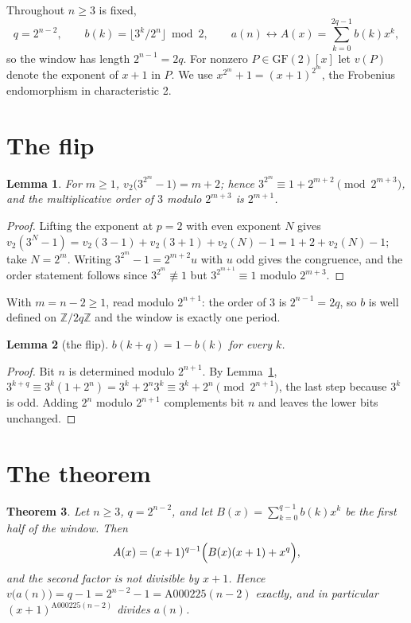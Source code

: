 \documentclass[11pt,a4paper]{article}
\theoremstyle{plain}
\newtheorem{theorem}{Theorem}
\newtheorem{lemma}[theorem]{Lemma}
\theoremstyle{definition}
\begin{document}
Throughout $n\ge3$ is fixed,
\[
  q=2^{n-2},\qquad b(k)=\bigl\lfloor 3^{k}/2^{n}\bigr\rfloor\bmod 2,\qquad
  a(n)\longleftrightarrow A(x)=\sum_{k=0}^{2q-1}b(k)x^{k},
\]
so the window has length $2^{n-1}=2q$. For nonzero $P\in\mathrm{GF}(2)[x]$ let $v(P)$
denote the exponent of $x+1$ in $P$. We use $x^{2^{m}}+1=(x+1)^{2^{m}}$, the Frobenius
endomorphism in characteristic 2.

\section{The flip}

\begin{lemma}\label{lem:lte}
For $m\ge1$, $v_{2}\bigl(3^{2^{m}}-1\bigr)=m+2$; hence
$3^{2^{m}}\equiv1+2^{m+2}\pmod{2^{m+3}}$, and the multiplicative order of $3$ modulo
$2^{m+3}$ is $2^{m+1}$.
\end{lemma}

\begin{proof}
Lifting the exponent at $p=2$ with even exponent $N$ gives
$v_{2}(3^{N}-1)=v_{2}(3-1)+v_{2}(3+1)+v_{2}(N)-1=1+2+v_{2}(N)-1$; take $N=2^{m}$. Writing
$3^{2^{m}}-1=2^{m+2}u$ with $u$ odd gives the congruence, and the order statement follows
since $3^{2^{m}}\not\equiv1$ but $3^{2^{m+1}}\equiv1$ modulo $2^{m+3}$.
\end{proof}

With $m=n-2\ge1$, read modulo $2^{n+1}$: the order of 3 is $2^{n-1}=2q$, so $b$ is well
defined on $\mathbb{Z}/2q\mathbb{Z}$ and the window is exactly one period.

\begin{lemma}[the flip]\label{lem:flip}
$b(k+q)=1-b(k)$ for every $k$.
\end{lemma}

\begin{proof}
Bit $n$ is determined modulo $2^{n+1}$. By Lemma~\ref{lem:lte},
$3^{k+q}\equiv3^{k}(1+2^{n})=3^{k}+2^{n}3^{k}\equiv3^{k}+2^{n}\pmod{2^{n+1}}$, the last
step because $3^{k}$ is odd. Adding $2^{n}$ modulo $2^{n+1}$ complements bit $n$ and leaves
the lower bits unchanged.
\end{proof}

\section{The theorem}

\begin{theorem}\label{thm:main}
Let $n\ge3$, $q=2^{n-2}$, and let $B(x)=\sum_{k=0}^{q-1}b(k)x^{k}$ be the first half of the
window. Then
\[
  A(x)=(x+1)^{q-1}\Bigl(B(x)(x+1)+x^{q}\Bigr),
\]
and the second factor is not divisible by $x+1$. Hence
$v\bigl(a(n)\bigr)=q-1=2^{n-2}-1=\mathrm{A000225}(n-2)$ exactly, and in particular
$(x+1)^{\mathrm{A000225}(n-2)}$ divides $a(n)$.
\end{theorem}
\end{document}
